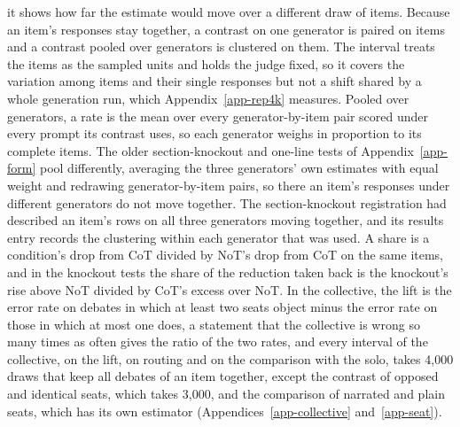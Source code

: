it shows how far the estimate would move over a different draw of items.
Because an item's responses stay together, a contrast on one generator is
paired on items and a contrast pooled over generators is clustered on them.
The interval treats the items as the
sampled units and holds the judge fixed, so it covers the variation among
items and their single responses but not a shift shared by a whole
generation run, which Appendix~\ref{app-rep4k} measures. Pooled over
generators, a rate is the mean over every generator-by-item pair scored under
every prompt its contrast uses, so each generator weighs in proportion to its
complete items. The older section-knockout and one-line tests of
Appendix~\ref{app-form} pool differently, averaging the three generators' own
estimates with equal weight and redrawing generator-by-item pairs, so there an
item's responses under different generators do not move together. The
section-knockout registration had described an item's rows on all three
generators moving together, and its results entry records the clustering
within each generator that was used. A share is a condition's drop from CoT
divided by NoT's drop from CoT on the same items, and in the knockout tests
the share of the reduction taken back is the knockout's rise above NoT
divided by CoT's excess over NoT. In the collective, the lift is the error
rate on debates in which at least two seats object minus the error rate on
those in which at most one does, a statement that the collective is wrong so
many times as often gives the ratio of the two rates, and every interval of
the collective, on the lift, on routing and on the comparison with the solo,
takes 4,000 draws that keep all debates of an item together, except the
contrast of opposed and identical seats, which takes 3,000, and the comparison
of narrated and plain seats, which has its own estimator
(Appendices~\ref{app-collective} and~\ref{app-seat}).
